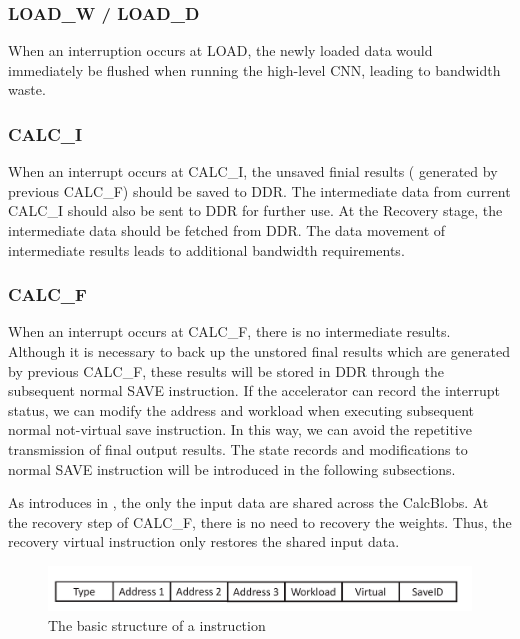 \subsubsection{LOAD\_W / LOAD\_D }
When an interruption occurs at LOAD, the newly loaded data would immediately be flushed when running the high-level CNN, leading to bandwidth waste.

\subsubsection{CALC\_I} 
When an interrupt occurs at CALC\_I, the unsaved finial results ( generated by previous CALC\_F) should be saved to DDR. The intermediate data from current CALC\_I should also be sent to DDR for further use. At the Recovery stage, the intermediate data should be fetched from DDR. The data movement of intermediate results leads to additional bandwidth requirements.


\subsubsection{CALC\_F}
When an interrupt occurs at CALC\_F, there is no intermediate results. Although it is necessary to back up the unstored final results which are generated by previous CALC\_F, these results will be stored in DDR through the subsequent normal SAVE instruction.
If the accelerator can record the interrupt status, we can modify the address and workload when executing subsequent normal not-virtual save instruction.
In this way, we can avoid the repetitive transmission of final output results.
The state records and modifications to normal SAVE instruction will be introduced in the following subsections.

As introduces in , the only the input data are shared across the CalcBlobs. At the recovery step of CALC\_F, there is no need to recovery the weights. Thus, the recovery virtual instruction only restores the shared input data.

\begin{figure}[h]
	\centering
	\includegraphics[width=0.99\linewidth]{fig/virtual_instr.pdf}
	\caption{The basic structure of a instruction }
	\label{fig:virtual_instr}
\end{figure}



